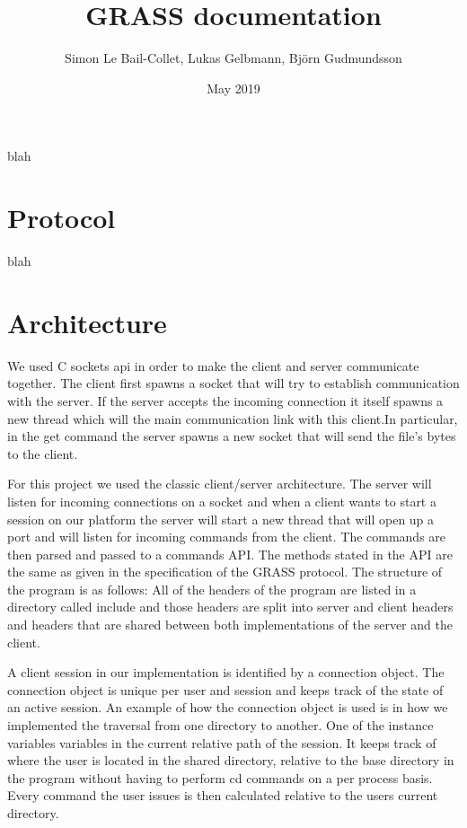 \documentclass{article}
\title{GRASS documentation}
\author{Simon Le Bail-Collet, Lukas Gelbmann, Björn Gudmundsson}
\date{May 2019}
\begin{document}
\maketitle

blah

\section{Protocol}

blah

\section{Architecture}
We used C sockets api in order to make the client and server communicate together. The client first spawns a socket that will try to establish communication with the server. If the server accepts the incoming connection it itself spawns a new thread which will the main communication link with this client.In particular, in the get command the server spawns a new socket that will send the file's bytes to the client. 

For this project we used the classic client/server architecture. The server will listen for incoming connections on a socket and when a client wants to start
a session on our platform the server will start a new thread that will open up a port and will listen for incoming commands from the client. The commands are then parsed 
and passed to a commands API. The methods stated in the API are the same as given in the specification of the GRASS protocol. The structure of the program is as follows: All of the
headers of the program are listed in a directory called include and those headers are split into server and client headers and headers that are shared between both
implementations of the server and the client. 

A client session in our implementation is identified by a connection object. The connection object is unique per user and session and keeps track of the state of
an active session. An example of how the connection object is used is in how we implemented the traversal from one directory to another. One of the instance variables 
variables in the current relative path of the session. It keeps track of where the user is located in the shared directory, relative to the base directory in the program without having to perform
cd commands on a per process basis. Every command the user issues is then calculated relative to the users current directory. 
\end{document}
